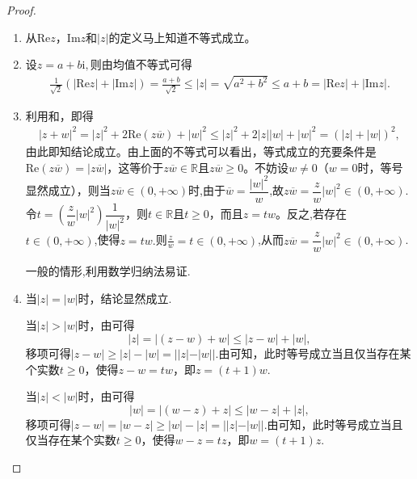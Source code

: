 \documentclass[../../main.tex]{subfiles}%
\begin{document}
\begin{proof}
\begin{enumerate}[(1)]
\item 从\(\mathrm{Re}z\)，\(\mathrm{Im}z\)和\(|z|\)的定义马上知道不等式成立。

\item 设$z=a+b\mathrm{i},$则由均值不等式可得
\begin{align*}
\frac{1}{\sqrt{2}}\left( \left| \mathrm{Re}z \right|+\left| \mathrm{Im}z \right| \right) =\frac{a+b}{\sqrt{2}}\leqslant \left| z \right|=\sqrt{a^2+b^2}\leqslant a+b=\left| \mathrm{Re}z \right|+\left| \mathrm{Im}z \right|.
\end{align*}

\item 利用和，即得
\begin{align*}
|z + w|^2  = |z|^2 + 2\mathrm{Re}(z\overline{w}) + |w|^2\leqslant |z|^2 + 2|z||w| + |w|^2 = (|z| + |w|)^2,
\end{align*}
由此即知结论成立。由上面的不等式可以看出，等式成立的充要条件是\(\mathrm{Re}(z\overline{w}) = |z\overline{w}|\)，这等价于$z\overline{w}\in \mathbb{R}$且\(z\overline{w} \geqslant 0\)。不妨设\(w \neq 0\)（\(w = 0\)时，等号显然成立），则当$z\overline{w}\in (0,+\infty)$时,由于\(\overline{w} = \dfrac{|w|^2}{w}\),故\(z\overline{w}=\dfrac{z}{w}|w|^2 \in(0,+\infty)\).令\(t = \left( \dfrac{z}{w}|w|^2 \right) \dfrac{1}{|w|^2}\)，则$t\in \mathbb{R}$且\(t \geqslant 0\)，而且\(z = tw\)。反之,若存在$t\in (0,+\infty)$,使得$z=tw.$则$\frac{z}{w}=t\in (0,+\infty)$,从而\(z\overline{w}=\dfrac{z}{w}|w|^2 \in(0,+\infty)\).

一般的情形,利用数学归纳法易证.

\item 当\(| z | = | w |\)时，结论显然成立.

当\(| z | > | w |\)时，由可得
\[| z | = | (z - w) + w | \leqslant | z - w | + | w |,\]
移项可得\(| z - w | \geqslant | z | - | w | = | | z | - | w | |\).由可知，此时等号成立当且仅当存在某个实数\(t \geqslant 0\)，使得\(z - w = tw\)，即\(z = (t + 1)w\).

当\(| z | < | w |\)时，由可得
\[| w | = | (w - z) + z | \leqslant | w - z | + | z |,\]
移项可得\(| z - w | = | w - z | \geqslant | w | - | z | = | | z | - | w | |\).由可知，此时等号成立当且仅当存在某个实数\(t \geqslant 0\)，使得\(w - z = tz\)，即\(w = (t + 1)z\).
\end{enumerate}
\end{proof}
\end{document}
